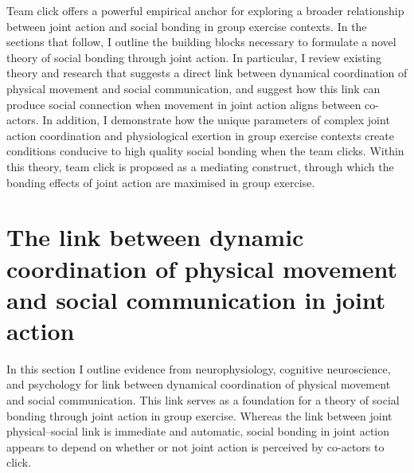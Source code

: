 \begin{CJK}{UTF8}{gbsn}
Team click offers a powerful empirical anchor for exploring a broader relationship between joint action and social bonding in group exercise contexts.  In the sections that follow, I outline the building blocks necessary to formulate a novel theory of social bonding through joint action.  In particular, I review existing theory and research that suggests a direct link between dynamical coordination of physical movement and social communication, and suggest how this link can produce social connection when movement in joint action aligns between co-actors.  In addition, I demonstrate how the unique parameters of complex joint action coordination and physiological exertion in group exercise contexts create conditions conducive to high quality social bonding when the team clicks.  Within this theory, team click is proposed as a mediating construct, through which the bonding effects of joint action are maximised in group exercise.

























\section{The link between dynamic coordination of physical movement and social communication in joint action \label{sect:physicalMovementSocialCommunication}}

In this section I outline evidence from neurophysiology, cognitive neuroscience, and psychology for link between dynamical coordination of physical movement and social communication.  This link serves as a foundation for a theory of social bonding through joint action in group exercise.  Whereas the link between joint physical--social link is immediate and automatic, social bonding in joint action appears to depend on whether or not joint action is perceived by co-actors to click.


\end{CJK}
